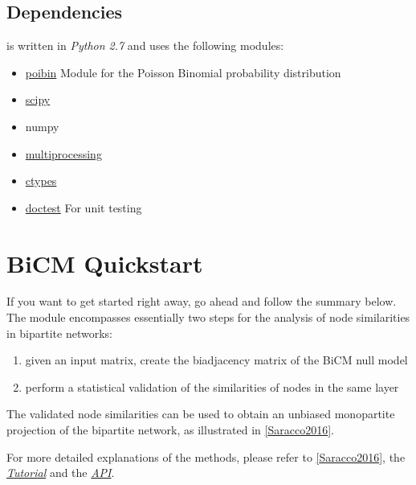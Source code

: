 \documentclass[letterpaper,10pt,english]{sphinxmanual}
\begin{document}
\subsection{Dependencies}
\label{source/overview:dependencies}
 is written in \emph{Python 2.7} and uses the following modules:
\begin{itemize}
\item {} 
\href{https://github.com/tsakim/poibin}{poibin} Module for the Poisson Binomial
probability distribution

\item {} 
\href{https://www.scipy.org/}{scipy}

\item {} 
numpy

\item {} 
\href{https://docs.python.org/2/library/multiprocessing.html}{multiprocessing}

\item {} 
\href{https://docs.python.org/2/library/ctypes.html}{ctypes}

\item {} 
\href{https://docs.python.org/2/library/doctest.html}{doctest} For unit testing

\end{itemize}


\section{BiCM Quickstart}
\label{source/quickstart:bicm-quickstart}\label{source/quickstart::doc}
If you want to get started right away, go ahead and follow the summary below.  The  module encompasses essentially two steps for the analysis of node similarities in bipartite networks:
\begin{enumerate}
\item {} 
given an input matrix, create the biadjacency matrix of the BiCM null model

\item {} 
perform a statistical validation of the similarities of nodes in the same
layer

\end{enumerate}

The validated node similarities can be used to obtain an unbiased monopartite projection of the bipartite network, as illustrated in {\hyperref[source/quickstart:saracco2016]{{[}Saracco2016{]}}}.

For more detailed explanations of the methods, please refer to {\hyperref[source/quickstart:saracco2016]{{[}Saracco2016{]}}}, the {\hyperref[source/tutorial:tutorial]{\emph{Tutorial}}} and the {\hyperref[source/src:api]{\emph{API}}}.
\end{document}
